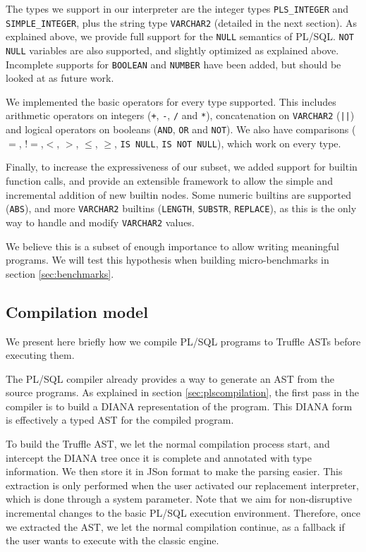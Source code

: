 \documentclass[twoside,11pt,a4paper]{article}
\newcommand{\maybe}[1]{\textit{(maybe ? #1)}}
\newcommand{\pls}[1]{\texttt{#1}}
\newcommand{\plstype}[1]{\pls{#1}}
\newcommand{\varchar}{\plstype{VARCHAR2}}
\newcommand{\plsi}{\plstype{PLS\_INTEGER}}
\newcommand{\simpleint}{\plstype{SIMPLE\_INTEGER}}
\newcommand{\plsnull}{\pls{NULL}}
\begin{document}
The types we support in our interpreter are the integer types \plsi{} and \simpleint{}, plus the string type \varchar{} (detailed in the next section). As explained above, we provide full support for the \plsnull{} semantics of PL/SQL. \pls{NOT NULL} variables are also supported, and slightly optimized as explained above. Incomplete supports for \pls{BOOLEAN} and \pls{NUMBER} have been added, but should be looked at as future work.

We implemented the basic operators for every type supported. This includes arithmetic operators on integers (\pls{+}, \pls{-}, \pls{/} and \pls{*}), concatenation on \varchar{} (\pls{||}) and logical operators on booleans (\pls{AND}, \pls{OR} and \pls{NOT}). We also have comparisons ($=$, $!=$,$<$, $>$, $\leq$, $\geq$, \pls{IS NULL}, \pls{IS NOT NULL}), which work on every type.

Finally, to increase the expressiveness of our subset, we added support for builtin function calls, and provide an extensible framework to allow the simple and incremental addition of new builtin nodes. Some numeric builtins are supported (\pls{ABS}), and more \varchar{} builtins (\pls{LENGTH}, \pls{SUBSTR}, \pls{REPLACE}), as this is the only way to handle and modify \varchar{} values.

We believe this is a subset of enough importance to allow writing meaningful programs. We will test this hypothesis when building micro-benchmarks in section \ref{sec:benchmarks}.

\subsection{Compilation model}

We present here briefly how we compile PL/SQL programs to Truffle ASTs before executing them.

The PL/SQL compiler already provides a way to generate an AST from the source programs. As explained in section \ref{sec:plscompilation}, the first pass in the compiler is to build a DIANA representation of the program. This DIANA form is effectively a typed AST for the compiled program.

To build the Truffle AST, we let the normal compilation process start, and intercept the DIANA tree once it is complete and annotated with type information. We then store it in JSon format to make the parsing easier. This extraction is only performed when the user activated our replacement interpreter, which is done through a system parameter. Note that we aim for non-disruptive incremental changes to the basic PL/SQL execution environment. Therefore, once we extracted the AST, we let the normal compilation continue, as a fallback if the user wants to execute with the classic engine.
\end{document}
